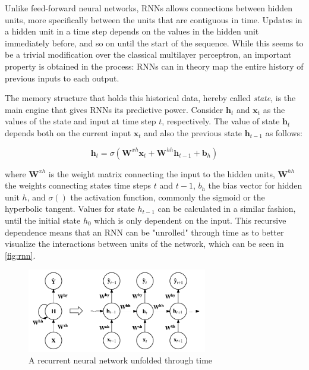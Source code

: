 \documentclass{kththesis}
\begin{document}
Unlike feed-forward neural networks, RNNs allows connections between hidden units, more specifically between the units that are contiguous in time. Updates in a hidden unit in a time step depends on the values in the hidden unit immediately before, and so on until the start of the sequence. While this seems to be a trivial modification over the classical multilayer perceptron, an important property is obtained in the process: RNNs can in theory map the entire history of previous inputs to each output. 

The memory structure that holds this historical data, hereby called \emph{state}, is the main engine that gives RNNs its predictive power. Consider $\mathbf{h}_t$ and $\mathbf{x}_t$ as the values of the state and input at time step $t$, respectively. The value of state $\mathbf{h}_t$ depends both on the current input $\mathbf{x}_t$ and also the previous state $\mathbf{h}_{t-1}$ as follows:

\begin{equation}
\mathbf{h}_t = \sigma(\mathbf{W}^{xh}\mathbf{x}_t + \mathbf{W}^{hh}\mathbf{h}_{t-1} + \mathbf{b}_h)
\end{equation}

where $\mathbf{W}^{xh}$ is the weight matrix connecting the input to the hidden units, $\mathbf{W}^{hh}$ the weights connecting states time steps $t$ and $t-1$, $b_h$ the bias vector for hidden unit $h$, and $\sigma()$ the activation function, commonly the sigmoid or the hyperbolic tangent. Values for state $h_{t-1}$ can be calculated in a similar fashion, until the initial state $h_0$ which is only dependent on the input. This recursive dependence means that an RNN can be "unrolled" through time as to better visualize the interactions between units of the network, which can be seen in \autoref{fig:rnn}.

\begin{figure}[h]
    \centering
    \includegraphics[width=0.7\textwidth,keepaspectratio]{figures/rnn.pdf}
    \caption{A recurrent neural network unfolded through time}
    \label{fig:rnn}
\end{figure}
\end{document}
